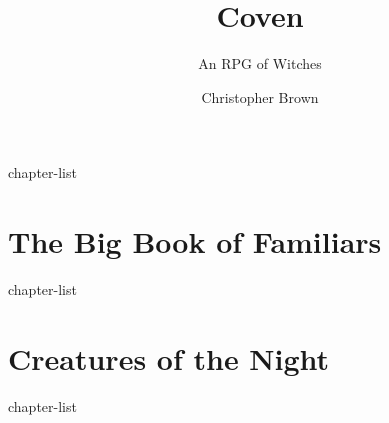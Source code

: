 \documentclass[a4paper,10pt,twocolumn]{memoir}
\title{Coven}
\subtitle{An RPG of Witches}
\author{Christopher Brown}
\begin{document}
\frontmatter

\titlepage



\tableofcontents

\mainmatter

{chapter-list}

\part{The Big Book of Familiars}
{chapter-list}

\part{Creatures of the Night}
{chapter-list}

\backmatter

\printindex
\end{document}
